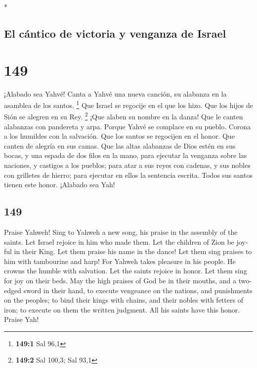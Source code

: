 \begin{paracol}{2}
\begin{otherlanguage}{english}
\end{otherlanguage}

\switchcolumn[0]*

\hypertarget{el-cuxe1ntico-de-victoria-y-venganza-de-israel}{%
\subsection{El cántico de victoria y venganza de
Israel}\label{el-cuxe1ntico-de-victoria-y-venganza-de-israel}}

\hypertarget{section-296}{%
\section{149}\label{section-296}}

 ¡Alabado sea Yahvé! Canta a Yahvé una nueva canción, su
alabanza en la asamblea de los santos. \footnote{\textbf{149:1} Sal 96,1}
 Que Israel se regocije en el que los hizo. Que los hijos
de Sión se alegren en su Rey. \footnote{\textbf{149:2} Sal 100,3; Sal
  93,1}  ¡Que alaben su nombre en la danza! Que le canten
alabanzas con pandereta y arpa.  Porque Yahvé se complace
en su pueblo. Corona a los humildes con la salvación.  Que
los santos se regocijen en el honor. Que canten de alegría en sus camas.
 Que las altas alabanzas de Dios estén en sus bocas, y una
espada de dos filos en la mano,  para ejecutar la venganza
sobre las naciones, y castigos a los pueblos;  para atar a
sus reyes con cadenas, y sus nobles con grilletes de hierro;
 para ejecutar en ellos la sentencia escrita. Todos sus
santos tienen este honor. ¡Alabado sea Yah!

\switchcolumn
\begin{otherlanguage}{english}

\hypertarget{section-297}{%
\section{149}\label{section-297}}

 Praise Yahweh! Sing to Yahweh a new song, his praise in
the assembly of the saints.  Let Israel rejoice in him who
made them. Let the children of Zion be joyful in their King.
 Let them praise his name in the dance! Let them sing
praises to him with tambourine and harp!  For Yahweh takes
pleasure in his people. He crowns the humble with salvation.
 Let the saints rejoice in honor. Let them sing for joy on
their beds.  May the high praises of God be in their
mouths, and a two-edged sword in their hand,  to execute
vengeance on the nations, and punishments on the peoples; 
to bind their kings with chains, and their nobles with fetters of iron;
 to execute on them the written judgment. All his saints
have this honor. Praise Yah!


\end{otherlanguage}
\end{paracol}
